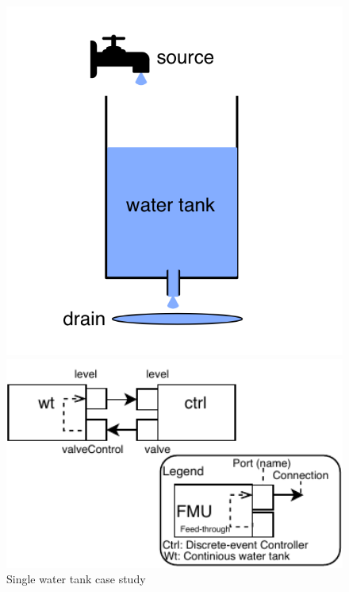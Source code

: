\documentclass[runningheads]{llncs}
\begin{document}
\begin{figure}[H]
    \centering
    \begin{minipage}{0.35\textwidth}
        \centering
    \includegraphics[width=1\textwidth]{images/singletank.png}
    \end{minipage}\hfill
    \begin{minipage}{0.55\textwidth}
        \centering
    \includegraphics[width=1\textwidth]{images/waterTankFMU-Page-1.pdf}
    \end{minipage}
    \caption{Single water tank case study}
    \label{fig:watertank}
\end{figure}
\end{document}
